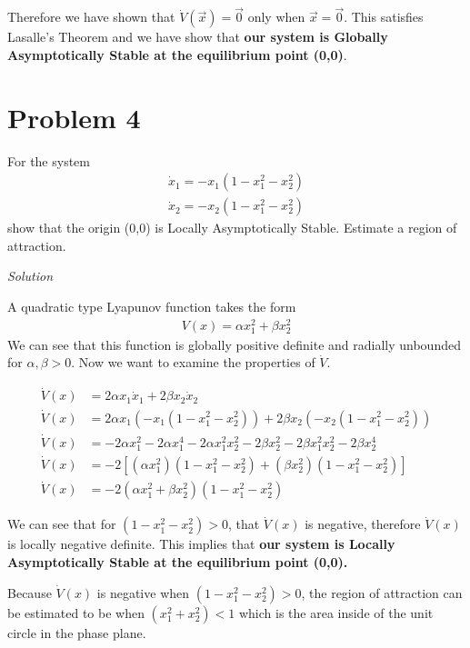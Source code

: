 \documentclass{article}
\begin{document}
  Therefore we have shown that $\dot{V}(\vec{x})=\vec{0}$ only when
  $\vec{x}=\vec{0}$. This satisfies Lasalle's Theorem and we have show that
  \textbf{our system is Globally Asymptotically Stable at the equilibrium point (0,0)}.

  \newpage

  \section{Problem 4}

  For the system
  \begin{align*}
    \dot{x}_1 = -x_1(1-x_1^2-x_2^2) \\
    \dot{x}_2 = -x_2(1-x_1^2-x_2^2)
  \end{align*}
  show that the origin (0,0) is Locally Asymptotically Stable. Estimate a region
  of attraction. \newline \newline

  \noindent \textit{Solution} \newline \newline

  A quadratic type Lyapunov function takes the form
  \begin{align*}
    V(x) = \alpha x_1^2 + \beta x_2^2
  \end{align*}
  We can see that this function is globally positive definite and radially unbounded for $\alpha, \beta
  >0 $. Now we want to examine the properties of $\dot{V}$.

  \begin{align*}
    \dot{V}(x) &= 2\alpha x_1\dot{x}_1 + 2\beta x_2\dot{x}_2 \\
    \dot{V}(x) &= 2\alpha x_1(-x_1(1-x_1^2-x_2^2)) + 2\beta x_2(-x_2(1-x_1^2-x_2^2)) \\
    \dot{V}(x) &= -2\alpha x_1^2 - 2\alpha x_1^4 - 2\alpha x_1^2x_2^2 - 2\beta x_2^2 -2\beta x_1^2x_2^2 - 2\beta x_2^4 \\
    \dot{V}(x) &= -2[(\alpha x_1^2)(1-x_1^2-x_2^2) + (\beta x_2^2)(1-x_1^2-x_2^2)] \\
    \dot{V}(x) &= -2(\alpha x_1^2 + \beta x_2^2)(1-x_1^2-x_2^2) 
  \end{align*}
 
  We can see that for $(1-x_1^2-x_2^2)>0$, that $\dot{V}(x)$ is negative,
  therefore $\dot{V}(x)$ is locally negative definite. This implies that \textbf{our
  system is Locally Asymptotically Stable at the equilibrium point (0,0).}
  \newline \newline

  Because $\dot{V}(x)$ is negative when $(1-x_1^2-x_2^2)>0$, the region of
  attraction can be estimated to be when $(x_1^2+x_2^2)<1$ which is the area
  inside of the unit circle in the phase plane. 
 
 
\end{document}
